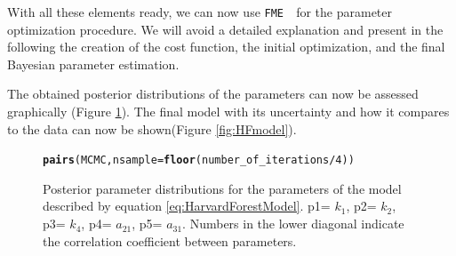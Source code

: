 \documentclass[a4paper]{article}\usepackage[]{graphicx}\usepackage[]{color}
\makeatletter
\newcommand{\hlnum}[1]{\textcolor[rgb]{0.686,0.059,0.569}{#1}}%
\newcommand{\hlopt}[1]{\textcolor[rgb]{0,0,0}{#1}}%
\newcommand{\hlstd}[1]{\textcolor[rgb]{0.345,0.345,0.345}{#1}}%
\newcommand{\hlkwc}[1]{\textcolor[rgb]{0.333,0.667,0.333}{#1}}%
\newcommand{\hlkwd}[1]{\textcolor[rgb]{0.737,0.353,0.396}{\textbf{#1}}}%
\newenvironment{kframe}{%
 \def\at@end@of@kframe{}%
 \ifinner\ifhmode%
  \def\at@end@of@kframe{\end{minipage}}%
  \begin{minipage}{\columnwidth}%
 \fi\fi%
 \def\FrameCommand##1{\hskip\@totalleftmargin \hskip-\fboxsep
 \colorbox{shadecolor}{##1}\hskip-\fboxsep
     \hskip-\linewidth \hskip-\@totalleftmargin \hskip\columnwidth}%
 \MakeFramed {\advance\hsize-\width
   \@totalleftmargin\z@ \linewidth\hsize
   \@setminipage}}%
 {\par\unskip\endMakeFramed%
 \at@end@of@kframe}
\newenvironment{knitrout}{}{} %
\newcommand{\FME}{\texttt{FME }}
\makeatother
\begin{document}
With all these elements ready, we can now use \FME \, for the parameter optimization procedure. We will avoid a detailed explanation and present in the following the creation of the cost function, the initial optimization, and the final Bayesian parameter estimation. 

\begin{knitrout}
\color{fgcolor}\begin{kframe}


{\ttfamily\noindent\bfseries\color{errorcolor}{\#\# Error in modFit(f = R14tCost, p = c(0.1, 0.2, 0.3, 0.4, 0.5), lower = rep(0, : object 'nk' not found}}

{\ttfamily\noindent\bfseries\color{errorcolor}{\#\# Error in eval(expr, envir, enclos): object 'Fit' not found}}

{\ttfamily\noindent\bfseries\color{errorcolor}{\#\# Error in summary(Fit): object 'Fit' not found}}

{\ttfamily\noindent\bfseries\color{errorcolor}{\#\# Error in modMCMC(f = R14tCost, p = Fit\$par, niter = number\_of\_iterations, : object 'Fit' not found}}\end{kframe}
\end{knitrout}

The obtained posterior distributions of the parameters can now be assessed graphically (Figure \ref{fig:HFmcmc}). The final model with its uncertainty and how it compares to the data can now be shown(Figure \ref{fig:HFmodel}). 
\begin{figure}
  \centering
\begin{knitrout}
\color{fgcolor}\begin{kframe}
\begin{alltt}
\hlkwd{pairs}\hlstd{(MCMC,}\hlkwc{nsample}\hlstd{=}\hlkwd{floor}\hlstd{(number_of_iterations}\hlopt{/}\hlnum{4}\hlstd{))}
\end{alltt}


{\ttfamily\noindent\bfseries\color{errorcolor}{\#\# Error in pairs(MCMC, nsample = floor(number\_of\_iterations/4)): object 'MCMC' not found}}\end{kframe}
\end{knitrout}
  \caption{Posterior parameter distributions for the parameters of the model described by equation \ref{eq:HarvardForestModel}. p1= $k_1$, p2= $k_2$, p3= $k_4$, p4= $a_{21}$, p5= $a_{31}$. Numbers in the lower diagonal indicate the correlation coefficient between parameters.}
  \label{fig:HFmcmc}
\end{figure}
\end{document}
